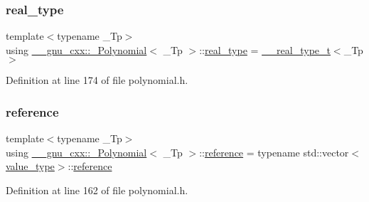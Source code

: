 \subsubsection{\texorpdfstring{real\+\_\+type}{real\_type}}
{\footnotesize\ttfamily template$<$typename \+\_\+\+Tp$>$ \\
using \hyperlink{class____gnu__cxx_1_1__Polynomial}{\+\_\+\+\_\+gnu\+\_\+cxx\+::\+\_\+\+Polynomial}$<$ \+\_\+\+Tp $>$\+::\hyperlink{class____gnu__cxx_1_1__Polynomial_a656ceaafcb42abd626c253da3284998b}{real\+\_\+type} =  \hyperlink{namespace____gnu__cxx_a3f707c0c6f6926cf68b74072733751f7}{\+\_\+\+\_\+real\+\_\+type\+\_\+t}$<$\+\_\+\+Tp$>$}



Definition at line 174 of file polynomial.\+h.

\mbox{\label{class____gnu__cxx_1_1__Polynomial_accb3b4df60e4ad82d466173d54ea731a}} 
\subsubsection{\texorpdfstring{reference}{reference}}
{\footnotesize\ttfamily template$<$typename \+\_\+\+Tp$>$ \\
using \hyperlink{class____gnu__cxx_1_1__Polynomial}{\+\_\+\+\_\+gnu\+\_\+cxx\+::\+\_\+\+Polynomial}$<$ \+\_\+\+Tp $>$\+::\hyperlink{class____gnu__cxx_1_1__Polynomial_accb3b4df60e4ad82d466173d54ea731a}{reference} =  typename std\+::vector$<$\hyperlink{class____gnu__cxx_1_1__Polynomial_a725563351f50e76084a7a016c06f8a53}{value\+\_\+type}$>$\+::\hyperlink{class____gnu__cxx_1_1__Polynomial_accb3b4df60e4ad82d466173d54ea731a}{reference}}



Definition at line 162 of file polynomial.\+h.

\mbox{\label{class____gnu__cxx_1_1__Polynomial_aed8f7d97c575d5c34c54170631953415}} 
